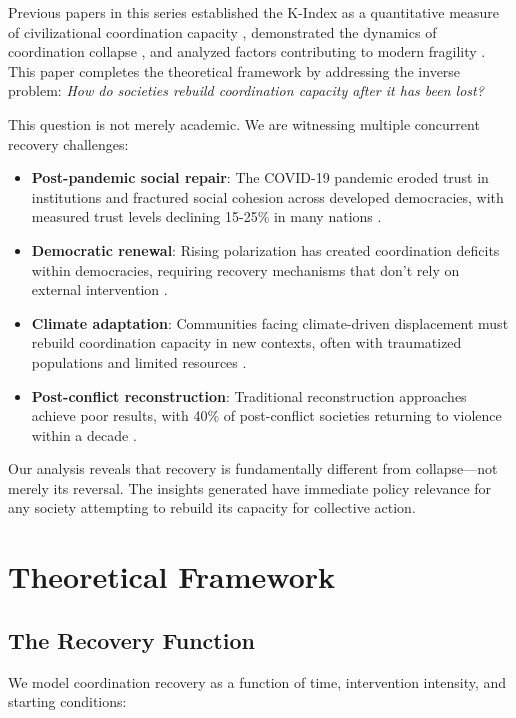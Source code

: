 \documentclass[11pt,letterpaper]{article}
\begin{document}
Previous papers in this series established the K-Index as a quantitative measure of civilizational coordination capacity \citep{Paper1}, demonstrated the dynamics of coordination collapse \citep{Paper2}, and analyzed factors contributing to modern fragility \citep{Paper3}. This paper completes the theoretical framework by addressing the inverse problem: \emph{How do societies rebuild coordination capacity after it has been lost?}

This question is not merely academic. We are witnessing multiple concurrent recovery challenges:
\begin{itemize}
\item \textbf{Post-pandemic social repair}: The COVID-19 pandemic eroded trust in institutions and fractured social cohesion across developed democracies, with measured trust levels declining 15-25\% in many nations \citep{pew2021trust}.
\item \textbf{Democratic renewal}: Rising polarization has created coordination deficits within democracies, requiring recovery mechanisms that don't rely on external intervention \citep{levitsky2018}.
\item \textbf{Climate adaptation}: Communities facing climate-driven displacement must rebuild coordination capacity in new contexts, often with traumatized populations and limited resources \citep{IPCC2023}.
\item \textbf{Post-conflict reconstruction}: Traditional reconstruction approaches achieve poor results, with 40\% of post-conflict societies returning to violence within a decade \citep{worldbank2011wdr}.
\end{itemize}

Our analysis reveals that recovery is fundamentally different from collapse---not merely its reversal. The insights generated have immediate policy relevance for any society attempting to rebuild its capacity for collective action.

\section{Theoretical Framework}

\subsection{The Recovery Function}

We model coordination recovery as a function of time, intervention intensity, and starting conditions:
\end{document}
